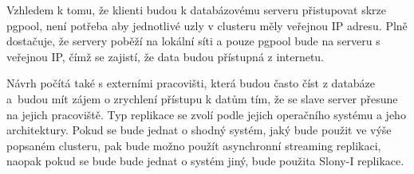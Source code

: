 Vzhledem k tomu, že klienti budou k databázovému serveru přistupovat skrze pgpool, není potřeba aby jednotlivé uzly v clusteru měly veřejnou IP adresu. Plně dostačuje, že servery poběží na lokální síti a pouze pgpool bude na serveru s veřejnou IP, čímž se zajistí, že data budou přístupná z internetu. 

Návrh počítá také s externími pracovišti, která budou často číst z databáze a~budou mít zájem o zrychlení přístupu k datům tím, že se slave server přesune na jejich pracoviště. Typ replikace se zvolí podle jejich operačního systému a jeho architektury. Pokud se bude jednat o shodný systém, jaký bude použit ve výše popsaném clusteru, pak bude možno použít asynchronní streaming replikaci, naopak pokud se bude bude jednat o systém jiný, bude použita Slony-I replikace. 

